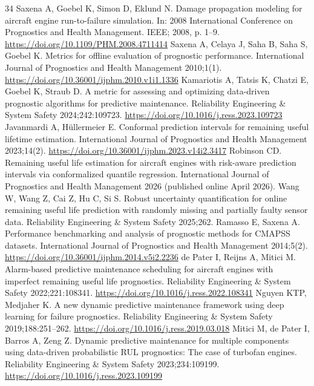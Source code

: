 \begin{thebibliography}{34}
 Saxena A, Goebel K, Simon D, Eklund N. Damage propagation modeling for aircraft engine run-to-failure simulation. In: 2008 International Conference on Prognostics and Health Management. IEEE; 2008, p. 1--9. \url{https://doi.org/10.1109/PHM.2008.4711414}
 Saxena A, Celaya J, Saha B, Saha S, Goebel K. Metrics for offline evaluation of prognostic performance. International Journal of Prognostics and Health Management 2010;1(1). \url{https://doi.org/10.36001/ijphm.2010.v1i1.1336}
 Kamariotis A, Tatsis K, Chatzi E, Goebel K, Straub D. A metric for assessing and optimizing data-driven prognostic algorithms for predictive maintenance. Reliability Engineering \& System Safety 2024;242:109723. \url{https://doi.org/10.1016/j.ress.2023.109723}
 Javanmardi A, H\"ullermeier E. Conformal prediction intervals for remaining useful lifetime estimation. International Journal of Prognostics and Health Management 2023;14(2). \url{https://doi.org/10.36001/ijphm.2023.v14i2.3417}
 Robinson CD. Remaining useful life estimation for aircraft engines with risk-aware prediction intervals via conformalized quantile regression. International Journal of Prognostics and Health Management 2026 (published online April 2026).
 Wang W, Wang Z, Cai Z, Hu C, Si S. Robust uncertainty quantification for online remaining useful life prediction with randomly missing and partially faulty sensor data. Reliability Engineering \& System Safety 2025;262.
 Ramasso E, Saxena A. Performance benchmarking and analysis of prognostic methods for CMAPSS datasets. International Journal of Prognostics and Health Management 2014;5(2). \url{https://doi.org/10.36001/ijphm.2014.v5i2.2236}
 de Pater I, Reijns A, Mitici M. Alarm-based predictive maintenance scheduling for aircraft engines with imperfect remaining useful life prognostics. Reliability Engineering \& System Safety 2022;221:108341. \url{https://doi.org/10.1016/j.ress.2022.108341}
 Nguyen KTP, Medjaher K. A new dynamic predictive maintenance framework using deep learning for failure prognostics. Reliability Engineering \& System Safety 2019;188:251--262. \url{https://doi.org/10.1016/j.ress.2019.03.018}
 Mitici M, de Pater I, Barros A, Zeng Z. Dynamic predictive maintenance for multiple components using data-driven probabilistic RUL prognostics: The case of turbofan engines. Reliability Engineering \& System Safety 2023;234:109199. \url{https://doi.org/10.1016/j.ress.2023.109199}

\end{thebibliography}
